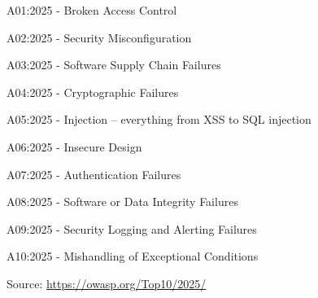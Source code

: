 \documentclass[Screen16to9,17pt]{foils}
\begin{document}
\begin{list2}
\item A01:2025 - Broken Access Control
\item A02:2025 - Security Misconfiguration
\item A03:2025 - Software Supply Chain Failures
\item A04:2025 - Cryptographic Failures
\item A05:2025 - Injection -- everything from XSS to SQL injection
\item A06:2025 - Insecure Design
\item A07:2025 - Authentication Failures
\item A08:2025 - Software or Data Integrity Failures
\item A09:2025 - Security Logging and Alerting Failures
\item A10:2025 - Mishandling of Exceptional Conditions
\end{list2}
Source: \url{https://owasp.org/Top10/2025/}




\end{document}
